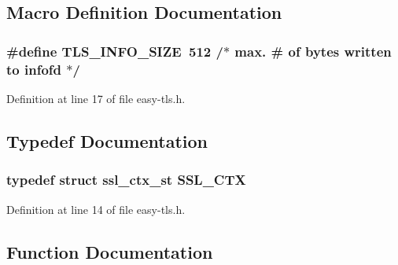 \subsection{Macro Definition Documentation}
\subsubsection[{\texorpdfstring{T\+L\+S\+\_\+\+I\+N\+F\+O\+\_\+\+S\+I\+ZE}{TLS_INFO_SIZE}}]{\setlength{\rightskip}{0pt plus 5cm}\#define T\+L\+S\+\_\+\+I\+N\+F\+O\+\_\+\+S\+I\+ZE~512      /$\ast$ max. \# {\bf of} {\bf bytes} written to infofd $\ast$/}\hypertarget{easy-tls_8h_aa94455b7d59761b0cba2a21aa3f36cae}{}\label{easy-tls_8h_aa94455b7d59761b0cba2a21aa3f36cae}


Definition at line 17 of file easy-\/tls.\+h.



\subsection{Typedef Documentation}
\subsubsection[{\texorpdfstring{S\+S\+L\+\_\+\+C\+TX}{SSL_CTX}}]{\setlength{\rightskip}{0pt plus 5cm}typedef struct {\bf ssl\+\_\+ctx\+\_\+st} {\bf S\+S\+L\+\_\+\+C\+TX}}\hypertarget{easy-tls_8h_a1a21892c1193ee6eb572c2c72d3924ca}{}\label{easy-tls_8h_a1a21892c1193ee6eb572c2c72d3924ca}


Definition at line 14 of file easy-\/tls.\+h.



\subsection{Function Documentation}
